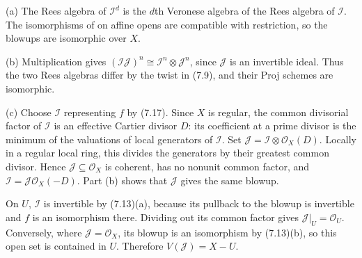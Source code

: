 (a) The Rees algebra of $\mathcal I^d$ is the $d$th Veronese algebra of the Rees algebra of $\mathcal I$. The isomorphisms of  on affine opens are compatible with restriction, so the blowups are isomorphic over $X$.

(b) Multiplication gives $(\mathcal I\mathcal J)^n\cong\mathcal I^n\otimes\mathcal J^n$, since $\mathcal J$ is an invertible ideal. Thus the two Rees algebras differ by the twist in (7.9), and their Proj schemes are isomorphic.

(c) Choose $\mathcal I$ representing $f$ by (7.17). Since $X$ is regular, the common divisorial factor of $\mathcal I$ is an effective Cartier divisor $D$: its coefficient at a prime divisor is the minimum of the valuations of local generators of $\mathcal I$. Set $\mathcal J=\mathcal I\otimes\mathcal O_X(D)$. Locally in a regular local ring, this divides the generators by their greatest common divisor. Hence $\mathcal J\subseteq\mathcal O_X$ is coherent, has no nonunit common factor, and $\mathcal I=\mathcal J\mathcal O_X(-D)$. Part (b) shows that $\mathcal J$ gives the same blowup.

On $U$, $\mathcal I$ is invertible by (7.13)(a), because its pullback to the blowup is invertible and $f$ is an isomorphism there. Dividing out its common factor gives $\mathcal J|_U=\mathcal O_U$. Conversely, where $\mathcal J=\mathcal O_X$, its blowup is an isomorphism by (7.13)(b), so this open set is contained in $U$. Therefore $V(\mathcal J)=X-U$.
